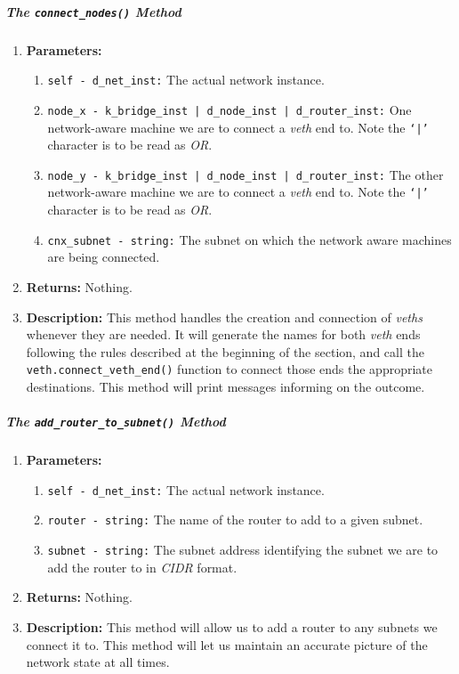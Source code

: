         \subparagraph{The \texttt{connect\_nodes()} Method}
            \begin{enumerate}
                \item \textbf{Parameters:}
                \begin{enumerate}
                    \item \texttt{self - d\_net\_inst:} The actual network instance.
                    \item \texttt{node\_x - k\_bridge\_inst | d\_node\_inst | d\_router\_inst:} One network-aware machine we are to connect a \textit{veth} end to. Note the \texttt{`|'} character is to be read as \textit{OR}.
                    \item \texttt{node\_y - k\_bridge\_inst | d\_node\_inst | d\_router\_inst:} The other network-aware machine we are to connect a \textit{veth} end to. Note the \texttt{`|'} character is to be read as \textit{OR}.
                    \item \texttt{cnx\_subnet - string:} The subnet on which the network aware machines are being connected.
                \end{enumerate}
                \item \textbf{Returns:} Nothing.
                \item \textbf{Description:} This method handles the creation and connection of \textit{veths} whenever they are needed. It will generate the names for both \textit{veth} ends following the rules described at the beginning of the section, and call the \texttt{veth.connect\_veth\_end()} function to connect those ends the appropriate destinations. This method will print messages informing on the outcome.
            \end{enumerate}

        \subparagraph{The \texttt{add\_router\_to\_subnet()} Method}
            \begin{enumerate}
                \item \textbf{Parameters:}
                \begin{enumerate}
                    \item \texttt{self - d\_net\_inst:} The actual network instance.
                    \item \texttt{router - string:} The name of the router to add to a given subnet.
                    \item \texttt{subnet - string:} The subnet address identifying the subnet we are to add the router to in \textit{CIDR} format.
                \end{enumerate}
                \item \textbf{Returns:} Nothing.
                \item \textbf{Description:} This method will allow us to add a router to any subnets we connect it to. This method will let us maintain an accurate picture of the network state at all times.
            \end{enumerate}

